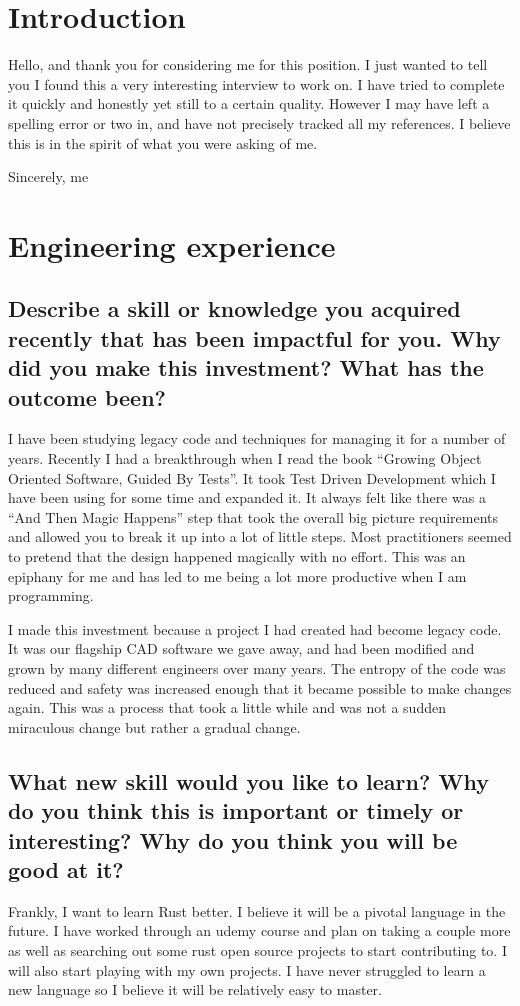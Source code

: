 \documentclass[letter,12pt]{article}
\begin{document}
\section{Introduction}
Hello, and thank you for considering me for this position. I just wanted to tell you I found this a very interesting interview to work on. I have tried to complete it quickly and honestly yet still to a certain quality. However I may have left a spelling error or two in, and have not precisely tracked all my references. I believe this is in the spirit of what you were asking of me.

Sincerely, me

\section{Engineering experience}

\subsection{Describe a skill or knowledge you acquired recently that has been impactful for you. Why did you make this investment? What has the outcome been?}
I have been studying legacy code and techniques for managing it for a number of years. Recently I had a breakthrough when I read the book ``Growing Object Oriented Software, Guided By Tests''. It took Test Driven Development which I have been using for some time and expanded it. It always felt like there was a ``And Then Magic Happens'' step that took the overall big picture requirements and allowed you to break it up into a lot of little steps. Most practitioners seemed to pretend that the design happened magically with no effort. This was an epiphany for me and has led to me being a lot more productive when I am programming.

I made this investment because a project I had created had become legacy code. It was our flagship CAD software we gave away, and had been modified and grown by many different engineers over many years. The entropy of the code was reduced and safety was increased enough that it became possible to make changes again. This was a process that took a little while and was not a sudden miraculous change but rather a gradual change.

\subsection{What new skill would you like to learn? Why do you think this is important or timely or interesting? Why do you think you will be good at it?}
Frankly, I want to learn Rust better. I believe it will be a pivotal language in the future. I have worked through an udemy course and plan on taking a couple more as well as searching out some rust open source projects to start contributing to. I will also start playing with my own projects. I have never struggled to learn a new language so I believe it will be relatively easy to master.
\end{document}
